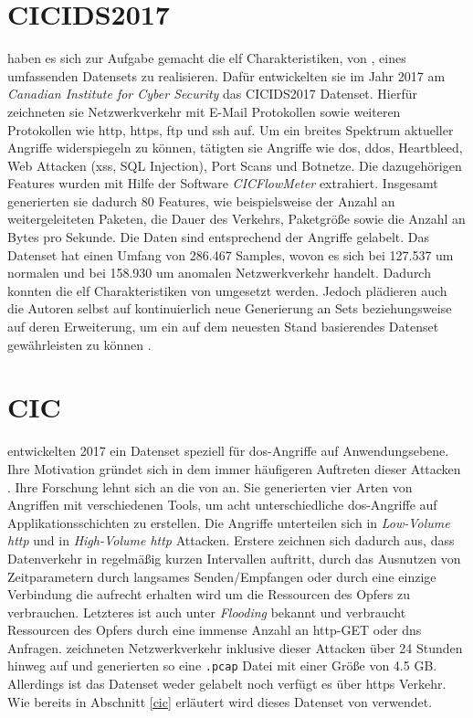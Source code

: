 \documentclass[
    12pt, %
    DIV10,
    ngerman, %
    a4paper, %
    oneside, %
    titlepage, %
    parskip=half, %
    headings=normal, %
    listof=totoc, %
    bibliography=totoc, %
    index=totoc, %
    captions=tableheading, %
    final %
]{scrreprt}
\begin{document}
\section{CICIDS2017}
\textcite{Sharafaldin2018} haben es sich zur Aufgabe gemacht die elf Charakteristiken, von \citeauthor{7885840}, eines umfassenden Datensets zu realisieren. Dafür entwickelten sie im Jahr 2017 am \emph{Canadian Institute for Cyber Security} das CICIDS2017 Datenset. Hierfür zeichneten sie Netzwerkverkehr mit E-Mail Protokollen sowie weiteren Protokollen wie \ac{http}, \ac{https}, \ac{ftp} und \ac{ssh} auf. Um ein breites Spektrum aktueller Angriffe widerspiegeln zu können, tätigten sie Angriffe wie \ac{dos}, \ac{ddos}, Heartbleed, Web Attacken (\ac{xss}, SQL Injection), Port Scans und Botnetze. Die dazugehörigen Features wurden mit Hilfe der Software \emph{CICFlowMeter} \parencite{Lashkari201} extrahiert. Insgesamt generierten sie dadurch 80 Features, wie beispielsweise der Anzahl an weitergeleiteten Paketen, die Dauer des Verkehrs, Paketgrö{\ss}e sowie die Anzahl an Bytes pro Sekunde.
Die Daten sind entsprechend der Angriffe gelabelt. Das Datenset hat einen Umfang von 286.467 Samples, wovon es sich bei 127.537 um normalen und bei 158.930 um anomalen Netzwerkverkehr handelt. Dadurch konnten die elf Charakteristiken von \citeauthor{7885840} umgesetzt werden. Jedoch plädieren auch die Autoren selbst auf kontinuierlich neue Generierung an Sets beziehungsweise auf deren Erweiterung, um ein auf dem neuesten Stand basierendes Datenset gewährleisten zu können \parencite{Sharafaldin2018}.
\section{CIC}
\textcite{jazi2017detecting} entwickelten 2017 ein Datenset speziell für \ac{dos}-Angriffe auf Anwendungsebene. Ihre Motivation gründet sich in dem immer häufigeren Auftreten dieser Attacken \parencite{NETSCOUT}.
Ihre Forschung lehnt sich an die von \textcite{shiravi2012toward} an. Sie generierten vier Arten von Angriffen mit verschiedenen Tools, um acht unterschiedliche \ac{dos}-Angriffe auf Applikationsschichten zu erstellen. Die Angriffe unterteilen sich in \emph{Low-Volume \ac{http}} und in \emph{High-Volume \ac{http}} Attacken. Erstere zeichnen sich dadurch aus, dass Datenverkehr in regelmä{\ss}ig kurzen Intervallen auftritt, durch das Ausnutzen von Zeitparametern durch langsames Senden/Empfangen oder durch eine einzige Verbindung die aufrecht erhalten wird um die Ressourcen des Opfers zu verbrauchen. Letzteres ist auch unter \emph{Flooding} bekannt und verbraucht Ressourcen des Opfers durch eine immense Anzahl an \ac{http}-GET oder \ac{dns} Anfragen. \citeauthor{jazi2017detecting} zeichneten Netzwerkverkehr inklusive dieser Attacken über 24 Stunden hinweg auf und generierten so eine \texttt{.pcap} Datei mit einer Grö{\ss}e von 4.5 GB. Allerdings ist das Datenset weder gelabelt noch verfügt es über \ac{https} Verkehr. Wie bereits in Abschnitt \ref{cic} erläutert wird dieses Datenset von \textcite{siracusano2018detection} verwendet.
\end{document}

